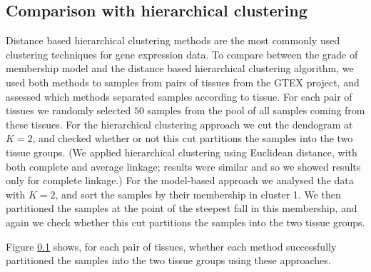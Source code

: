 \subsection{Comparison with hierarchical clustering}

Distance based hierarchical clustering methods are the most commonly used clustering techniques for gene expression data. To compare between the grade of membership model and the distance based hierarchical clustering algorithm, we used both methods to samples from pairs of tissues from the GTEX project, and assessed 
which methods separated samples according to tissue.  For each pair of tissues  we randomly selected $50$ samples from the pool of all samples coming from these tissues. 
For the hierarchical clustering approach we cut the dendogram at $K=2$, and checked whether or not this cut partitions the samples into the two tissue groups. 
(We applied hierarchical clustering using Euclidean distance, with both complete and average linkage; results were similar and so we showed results only for complete linkage.) 
For the model-based approach we analysed the data with $K=2$, and sort the samples by their membership in cluster 1. We then partitioned the samples at the point of the steepest fall in this membership, and again we check whether this cut partitions the samples into the two tissue groups.

Figure \ref{} shows, for each pair of tissues, whether each method successfully partitioned the samples into the two tissue groups using these approaches.
%























 









